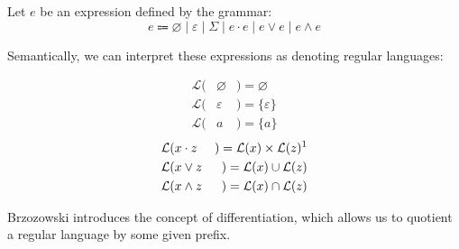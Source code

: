 \documentclass[sigplan,review,acmsmall,nonacm,screen,anonymous]{acmart}\settopmatter{printfolios=false,printccs=false,printacmref=false}
\begin{document}
  \begin{definition}
    Let \( e \) be an expression defined by the grammar:
    \[
      e \Coloneqq \varnothing \mid \varepsilon \mid \Sigma \mid e \cdot e \mid e \lor e \mid e \land e
    \]

    Semantically, we can interpret these expressions as denoting regular languages:
    \setlength{\columnseprule}{0pt}
    \setlength{\columnsep}{-3cm}
    \begin{multicols}{2}
      \begin{eqnarray*}
        \mathcal{L}(& \varnothing & ) = \varnothing \\
        \mathcal{L}(& \varepsilon & ) = \{\varepsilon\} \\
        \mathcal{L}(& a           & ) = \{a\}
      \end{eqnarray*} \break\vspace{-0.45cm}
      \begin{eqnarray*}
        \mathcal{L}(& x\cdot z & ) = \mathcal{L}(x) \times \mathcal{L}(z)\text{\footnotemark}\\
        \mathcal{L}(& x\vee  z & ) = \mathcal{L}(x) \cup   \mathcal{L}(z)\\
        \mathcal{L}(& x\land z & ) = \mathcal{L}(x) \cap   \mathcal{L}(z)
      \end{eqnarray*}
    \end{multicols}
  \end{definition}

  Brzozowski introduces the concept of differentiation, which allows us to quotient a regular language by some given prefix.
\end{document}
